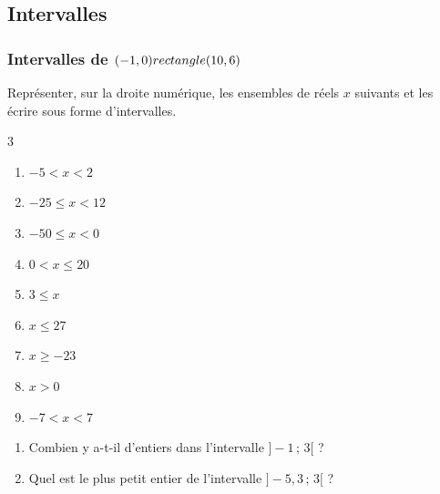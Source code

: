 {\subsection*{Intervalles}
\subsubsection*{Intervalles de $(-1,0) rectangle (10,6)$}

\begin{Exercice}  Représenter, sur la droite numérique, les ensembles de réels $x$ suivants et les écrire sous forme d'intervalles.


\begin{multicols}{3}
\begin{enumerate}
\item$-5<x<2$ 
\item$-25\leqslant x<12$ 
\item$-50\leqslant x<0$ 
\item$0<x\leqslant20$ 
\item$3\leqslant x$ 
\item$x \leqslant 27$ 
\item$x\geqslant -23$ 
\item$x>0$ 
\item$-7<x<7$ 

\end{enumerate} 
\end{multicols}
\end{Exercice}


\begin{Exercice}
\leavevmode\vspace{-\baselineskip}
\begin{enumerate}[itemsep=1em]
	\item \begin{minipage}[t]{\linewidth}Combien y a-t-il d'entiers dans l'intervalle $\bigg]-1  \, ; \, 3\bigg[$ ?\end{minipage}
	\vspace{-0.3cm}
	\item \begin{minipage}[t]{\linewidth}Quel est le plus petit entier de l'intervalle $\bigg]-5{,}3  \, ; \, 3\bigg[$ ?\end{minipage}
\end{enumerate}
\end{Exercice}

}
